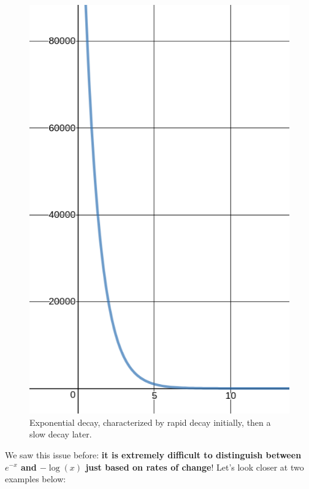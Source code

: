 \documentclass{ximera}
\begin{document}
\begin{theorem}
	\begin{figure}
		\includegraphics[scale=0.3]{expDecay.png}
		\caption{Exponential decay, characterized by rapid decay initially, then a slow decay later.}
	\end{figure}
	
\end{theorem}

We saw this issue before: \textbf{it is extremely difficult to distinguish between $e^{-x}$ and $-\log(x)$ just based on rates of change}! Let's look closer at two examples below:
\end{document}
